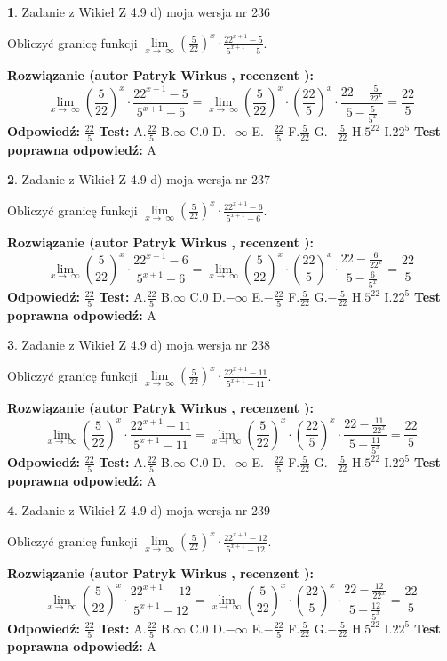 \documentclass[12pt, a4paper]{article}
\theoremstyle{definition} %
\newtheorem{zad}{}
\newcommand{\zadStart}[1]{\begin{zad}#1\newline}
\newcommand{\zadStop}{\end{zad}}
\newcommand{\rozwStart}[2]{\noindent \textbf{Rozwiązanie (autor #1 , recenzent #2): }\newline}
\newcommand{\rozwStop}{\newline}
\newcommand{\odpStart}{\noindent \textbf{Odpowiedź:}\newline}
\newcommand{\odpStop}{\newline}
\newcommand{\testStart}{\noindent \textbf{Test:}\newline}
\newcommand{\testStop}{\newline}
\newcommand{\kluczStart}{\noindent \textbf{Test poprawna odpowiedź:}\newline}
\newcommand{\kluczStop}{\newline}
\begin{document}
\zadStart{Zadanie z Wikieł Z 4.9 d) moja wersja nr 236}


Obliczyć granicę funkcji  $\lim\limits_{x\to\ \infty}(\frac{5}{22})^{x}\cdot\frac{22^{x+1}-5}{5^{x+1}-5}$.
\zadStop
\rozwStart{Patryk Wirkus}{}
$$\lim\limits_{x\to\ \infty}(\frac{5}{22})^{x}\cdot\frac{22^{x+1}-5}{5^{x+1}-5}=\lim\limits_{x\to\ \infty}(\frac{5}{22})^{x}\cdot(\frac{22}{5})^{x} \cdot \frac{22-\frac{5}{22^{x}}}{5-\frac{5}{5^{x}}} = \frac{22}{5}$$
\rozwStop
\odpStart
$\frac{22}{5}$
\odpStop
\testStart
A.$\frac{22}{5}$ B.$\infty$ C.$0$ D.$-\infty$ E.$-\frac{22}{5}$
F.$\frac{5}{22}$ G.$-\frac{5}{22}$
H.$5^{22}$
I.$22^{5}$
\testStop
\kluczStart
A
\kluczStop



\zadStart{Zadanie z Wikieł Z 4.9 d) moja wersja nr 237}


Obliczyć granicę funkcji  $\lim\limits_{x\to\ \infty}(\frac{5}{22})^{x}\cdot\frac{22^{x+1}-6}{5^{x+1}-6}$.
\zadStop
\rozwStart{Patryk Wirkus}{}
$$\lim\limits_{x\to\ \infty}(\frac{5}{22})^{x}\cdot\frac{22^{x+1}-6}{5^{x+1}-6}=\lim\limits_{x\to\ \infty}(\frac{5}{22})^{x}\cdot(\frac{22}{5})^{x} \cdot \frac{22-\frac{6}{22^{x}}}{5-\frac{6}{5^{x}}} = \frac{22}{5}$$
\rozwStop
\odpStart
$\frac{22}{5}$
\odpStop
\testStart
A.$\frac{22}{5}$ B.$\infty$ C.$0$ D.$-\infty$ E.$-\frac{22}{5}$
F.$\frac{5}{22}$ G.$-\frac{5}{22}$
H.$5^{22}$
I.$22^{5}$
\testStop
\kluczStart
A
\kluczStop



\zadStart{Zadanie z Wikieł Z 4.9 d) moja wersja nr 238}


Obliczyć granicę funkcji  $\lim\limits_{x\to\ \infty}(\frac{5}{22})^{x}\cdot\frac{22^{x+1}-11}{5^{x+1}-11}$.
\zadStop
\rozwStart{Patryk Wirkus}{}
$$\lim\limits_{x\to\ \infty}(\frac{5}{22})^{x}\cdot\frac{22^{x+1}-11}{5^{x+1}-11}=\lim\limits_{x\to\ \infty}(\frac{5}{22})^{x}\cdot(\frac{22}{5})^{x} \cdot \frac{22-\frac{11}{22^{x}}}{5-\frac{11}{5^{x}}} = \frac{22}{5}$$
\rozwStop
\odpStart
$\frac{22}{5}$
\odpStop
\testStart
A.$\frac{22}{5}$ B.$\infty$ C.$0$ D.$-\infty$ E.$-\frac{22}{5}$
F.$\frac{5}{22}$ G.$-\frac{5}{22}$
H.$5^{22}$
I.$22^{5}$
\testStop
\kluczStart
A
\kluczStop



\zadStart{Zadanie z Wikieł Z 4.9 d) moja wersja nr 239}


Obliczyć granicę funkcji  $\lim\limits_{x\to\ \infty}(\frac{5}{22})^{x}\cdot\frac{22^{x+1}-12}{5^{x+1}-12}$.
\zadStop
\rozwStart{Patryk Wirkus}{}
$$\lim\limits_{x\to\ \infty}(\frac{5}{22})^{x}\cdot\frac{22^{x+1}-12}{5^{x+1}-12}=\lim\limits_{x\to\ \infty}(\frac{5}{22})^{x}\cdot(\frac{22}{5})^{x} \cdot \frac{22-\frac{12}{22^{x}}}{5-\frac{12}{5^{x}}} = \frac{22}{5}$$
\rozwStop
\odpStart
$\frac{22}{5}$
\odpStop
\testStart
A.$\frac{22}{5}$ B.$\infty$ C.$0$ D.$-\infty$ E.$-\frac{22}{5}$
F.$\frac{5}{22}$ G.$-\frac{5}{22}$
H.$5^{22}$
I.$22^{5}$
\testStop
\kluczStart
A
\kluczStop
\end{document}

